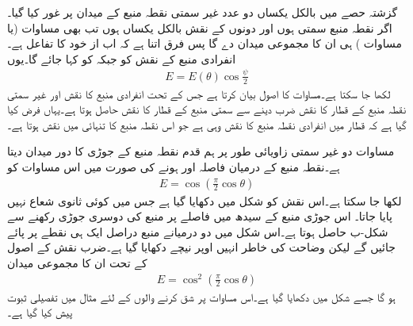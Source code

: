 گزشتہ حصے میں بالکل یکساں دو عدد غیر سمتی نقطہ منبع کے میدان پر غور کیا گیا۔اگر نقطہ منبع سمتی ہوں  اور دونوں کے نقش بالکل یکساں ہوں تب بھی مساوات  (یا مساوات ) ہی ان کا مجموعی میدان دے گا پس فرق اتنا ہے کہ اب  از خود  کا تفاعل  ہے۔ انفرادی منبع کے نقش  کو  جبکہ  کو   کہا جائے گا۔یوں
\begin{align}\label{مساوات_اینٹینا_ضرب_نقش}
E=E(\theta) \cos \frac{\psi}{2}
\end{align}
لکھا جا سکتا ہے۔مساوات   کا اصول بیان کرتا ہے جس کے تحت انفرادی منبع کا نقش اور غیر سمتی نقطہ منبع کے قطار کا نقش ضرب دینے سے سمتی منبع کے قطار کا نقش حاصل ہوتا ہے۔یہاں فرض کیا گیا ہے کہ قطار میں انفرادی نقطہ منبع کا نقش وہی ہے جو اس نقطہ منبع کا تنہائی میں نقش ہوتا ہے۔

مساوات  دو غیر سمتی زاویائی طور پر ہم قدم نقطہ منبع کے جوڑی کا دور میدان دیتا ہے۔نقطہ منبع کے درمیان فاصلہ  اور  ہونے کی صورت میں اس مساوات کو
\begin{align}
E=\cos \left(\frac{\pi}{2}\cos \theta\right)
\end{align}
لکھا جا سکتا ہے۔اس نقش کو شکل میں دکھایا گیا ہے جس میں کوئی ثانوی شعاع نہیں پایا جاتا۔ اس جوڑی منبع کے سیدھ میں  فاصلے پر منبع کی دوسری جوڑی رکھنے سے شکل-ب حاصل ہوتا ہے۔اس شکل میں دو درمیانے منبع دراصل ایک ہی نقطے پر پائے جائیں گے لیکن وضاحت کی خاطر انہیں اوپر نیچے دکھایا گیا ہے۔ضرب نقش کے اصول کے تحت ان کا مجموعی میدان
\begin{align}\label{مساوات_اینٹینا_تین_رکنی_قطار}
E=\cos^2 \left(\frac{\pi}{2}\cos \theta\right)
\end{align}
ہو گا جسے شکل میں دکھایا گیا ہے۔اس مساوات پر شق کرنے والوں کے لئے  مثال میں تفصیلی ثبوت پیش کیا گیا ہے۔

